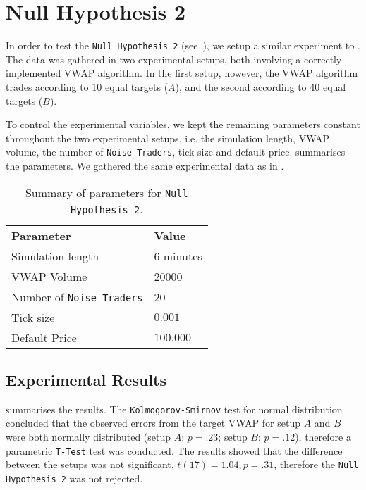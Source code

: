 \FloatBarrier
\section{Null Hypothesis 2}
\label{Chapters/Experiments-and-Results/Null-Hypothesis-2}
In order to test the \texttt{Null Hypothesis 2} (see~), we setup a similar experiment to . The data was gathered in two experimental setups, both involving a correctly implemented VWAP algorithm. In the first setup, however, the VWAP algorithm trades according to 10 equal targets ($A$), and the second according to 40 equal targets ($B$).

To control the experimental variables, we kept the remaining parameters constant throughout the two experimental setups, i.e. the simulation length, VWAP volume, the number of \texttt{Noise Traders}, tick size and default price.  summarises the parameters. We gathered the same experimental data as in .

\begin{table}[htbp]
\begin{center}
\begin{tabular}{ l p{2in} }
\textbf{Parameter} & \textbf{Value} \\
\cmidrule(r){1-2}

Simulation length		& 6 minutes  	\\ 
VWAP Volume				& 20000  		\\ 
Number of \texttt{Noise Traders}  	& 20	\\
Tick size  	& $0.001$	\\
Default Price  	& $100.000$	\\

\end{tabular}
\end{center}
\caption{Summary of parameters for \texttt{Null Hypothesis 2}.}
\label{Tables/Null-Hypothesis-2/Parameters}
\end{table}

\FloatBarrier
\subsection{Experimental Results}
 summarises the results. The \texttt{Kolmogorov-Smirnov} test for normal distribution concluded that the observed errors from the target VWAP for setup $A$ and $B$ were both normally distributed (setup $A$: $p=.23$; setup $B$: $p=.12$), therefore a parametric \texttt{T-Test} test was conducted. The results showed that the difference between the setups was not significant, $t(17)=1.04, p=.31$, therefore the \texttt{Null Hypothesis 2} was not rejected. 

